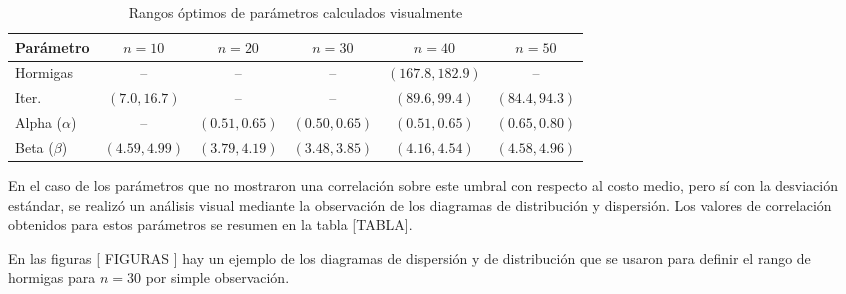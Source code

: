 \documentclass[conference]{IEEEtran}
\begin{document}
\begin{table}[h]
\centering
\setlength{\tabcolsep}{2pt}
\begin{tabular}{|l|c|c|c|c|c|}
\hline
Parámetro & $n=10$ & $n=20$ & $n=30$ & $n=40$ & $n=50$ \\
\hline
Hormigas & -- & -- & -- & $(167.8, 182.9)$ & -- \\
\hline
Iter. & $(7.0, 16.7)$ & -- & -- & $(89.6, 99.4)$ & $(84.4, 94.3)$ \\
\hline
Alpha ($\alpha$) & -- & $(0.51, 0.65)$ & $(0.50, 0.65)$ & $(0.51, 0.65)$ & $(0.65, 0.80)$ \\
\hline
Beta ($\beta$) & $(4.59, 4.99)$ & $(3.79, 4.19)$ & $(3.48, 3.85)$ & $(4.16, 4.54)$ & $(4.58, 4.96)$ \\
\hline
\end{tabular}
\caption{Rangos óptimos de parámetros calculados visualmente}
\label{tab:table2}
\end{table}

En el caso de los parámetros que no mostraron una correlación sobre este umbral con respecto al costo medio, pero sí con la desviación estándar, se realizó un análisis visual mediante la observación de los diagramas de distribución y dispersión. Los valores de correlación obtenidos para estos parámetros se resumen en la tabla [TABLA].

\begin{table}[h]
  \centering
  \caption{Correlaciones de parámetros con la desviación estándar del costo}
  \label{tab:table1}
\end{table}

En las figuras [ FIGURAS ] hay un ejemplo de los diagramas de dispersión y de distribución que se usaron para definir el rango de hormigas para $n=30$ por simple observación.
\end{document}
